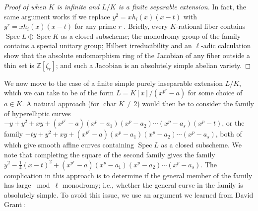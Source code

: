 \documentclass[11pt, reqno]{amsart}
\numberwithin{equation}{section}
\theoremstyle{definition}
\theoremstyle{remark}
\def\integ{{\mathbb Z}}
\DeclareMathOperator{\spec}{Spec}
\begin{document}
\begin{proof}[Proof of  when $K$ is infinite and $L/K$ is a finite  \emph{separable} extension]
In fact, the same argument works if we replace $y^2 = xh_i(x)(x-t)$
with $y^r = x h_i(x)(x-t)$ for any prime $r$ \cite[\S 2]{katzbigmonodromy}.  Briefly, every $K$-rational fiber contains $\spec L\oplus \spec K$ as a closed subscheme;  the monodromy group of the family
contains  a 
special unitary group; Hilbert irreducibility and an $\ell$-adic calculation show that the absolute endomorphism ring of the Jacobian of any
fiber outside a thin set is $\integ[\zeta_r]$; and such a Jacobian is
an absolutely simple abelian variety.
     \end{proof}


We now move to the case of a finite simple purely inseparable extension $L/K$, which we can take to be of the form $L=K[x]/(x^{p^r}-a)$ for some choice of $a\in K$.  A natural approach (for $\operatorname{char}K\ne 2$) would then be to consider the family of hyperelliptic curves 
$ -y + y^2 + xy + (x^{p^r}-a)(x^p-a_1)(x^p-a_2)\cdots (x^p-a_s)(x^p-t)$, or the family  $-ty + y^2 + xy + (x^{p^r}-a)(x^p-a_1)(x^p-a_2)\cdots (x^p-a_s)$, both of which give smooth affine curves containing $\operatorname{Spec}L$ as a closed subscheme. We note that completing the square of the second family gives the family $y^2-\frac{1}{4}(x-t)^2+(x^{p^r}-a)(x^p-a_1)(x^p-a_2)\cdots(x^p-a_s)$.  The complication in this approach is to determine if the general member of the family has large $\bmod \ell$ monodromy; i.e., whether the general curve in the family is absolutely simple.  To avoid this issue, we use an argument we learned from David Grant\,: 
\end{document}
